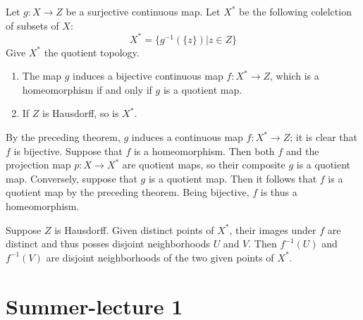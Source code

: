\documentclass[12pt, a4paper, twoside, openright, titlepage]{book}
\begin{document}
\begin{cor}{}{}
    Let $g:X\rightarrow Z$ be a surjective continuous map. Let $X^*$ be the following colelction of subsets of $X$: \begin{equation*}
        X^* = \{g^{-1}(\{z\})\vert z \in Z\}
    \end{equation*}
    Give $X^*$ the quotient topology. \begin{enumerate}
        \item The map $g$ induces a bijective continuous map $f:X^*\rightarrow Z$, which is a homeomorphism if and only if $g$ is a quotient map.
            \begin{center}
            \end{center}
            \item If $Z$ is Hausdorff, so is $X^*$.
    \end{enumerate}
\end{cor}
\begin{proof*}{}{}
    By the preceding theorem, $g$ induces a continuous map $f:X^*\rightarrow Z$; it is clear that $f$ is bijective. Suppose that $f$ is a homeomorphism. Then both $f$ and the projection map $p:X\rightarrow X^*$ are quotient maps, so their composite $g$ is a quotient map. Conversely, suppose that $g$ is a quotient map. Then it follows that $f$ is a quotient map by the preceding theorem. Being bijective, $f$ is thus a homeomorphism.

    Suppose $Z$ is Hausdorff. Given distinct points of $X^*$, their images under $f$ are distinct and thus posses disjoint neighborhoods $U$ and $V$. Then $f^{-1}(U)$ and $f^{-1}(V)$ are disjoint neighborhoods of the two given points of $X^*$.
\end{proof*}




\section{Summer-lecture 1}
\end{document}
